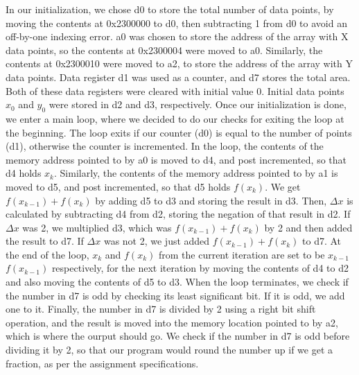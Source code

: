 \documentclass[letterpaper]{article}
\begin{document}
    In our initialization, we chose d0 to store the total number of data points,
    by moving the contents at 0x2300000 to d0, then subtracting 1 from d0 to
    avoid an off-by-one indexing error. a0 was chosen to store the address of
    the array with X data points, so the contents at 0x2300004 were moved to a0.
    Similarly, the contents at 0x2300010 were moved to a2, to store the address
    of the array with Y data points. Data register d1 was used as a counter, and
    d7 stores the total area. Both of these data registers were cleared with
    initial value 0. Initial data points $x_0$ and $y_0$ were stored in d2 and
    d3, respectively. Once our initialization is done, we enter a main loop,
    where we decided to do our checks for exiting the loop at the beginning. The
    loop exits if our counter (d0) is equal to the number of points (d1),
    otherwise the counter is incremented. In the loop, the contents of the
    memory address pointed to by a0 is moved to d4, and post incremented, so
    that d4 holds $x_k$. Similarly, the contents of the memory address pointed
    to by a1 is moved to d5, and post incremented, so that d5 holds $f(x_k)$. We
    get $f(x_{k-1})+f(x_k)$ by adding d5 to d3 and storing the result in d3.
    Then, $\Delta x$ is calculated by subtracting d4 from d2, storing the
    negation of that result in d2. If $\Delta x$ was 2, we multiplied d3, which
    was $f(x_{k-1})+f(x_k)$ by 2 and then added the result to d7. If $\Delta x$
    was not 2, we just added $f(x_{k-1})+f(x_k)$ to d7. At the end of the loop,
    $x_k$ and $f(x_k)$ from the current iteration are set to be $x_{k-1}$
    $f(x_{k-1})$ respectively, for the next iteration by moving the contents of
    d4 to d2 and also moving the contents of d5 to d3. When the loop terminates,
    we check if the number in d7 is odd by checking its least significant bit.
    If it is odd, we add one to it. Finally, the number in d7 is divided by 2
    using a right bit shift operation, and the result is moved into the memory
    location pointed to by a2, which is where the ourput should go. We check if
    the number in d7 is odd before dividing it by 2, so that our program would
    round the number up if we get a fraction, as per the assignment
    specifications.

\end{document}
